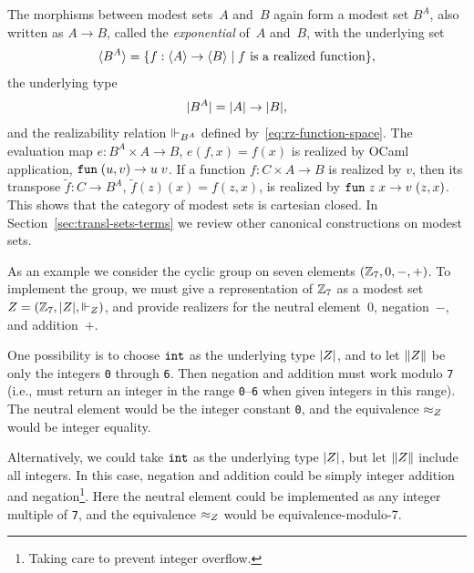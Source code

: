 The morphisms between modest sets~$A$ and~$B$ again form a modest set
$B^A$, also written as $A \to B$, called the \emph{exponential} of~$A$
and~$B$, with the underlying set
%
\begin{equation*}
  \langle B^A \rangle =
  \{f : \langle A \rangle \to \langle B \rangle \mid \text{$f$ is a realized function}\},
\end{equation*}
%
the underlying type
%
\begin{equation*}
  |B^A| = |A| \to |B|,
\end{equation*}
%
and the realizability relation $\Vdash_{B^A}$ defined
by~\eqref{eq:rz-function-space}. The evaluation map $e : B^A \times A
\to B$, $e(f,x) = f(x)$ is realized by OCaml application,
$\mathtt{fun}\;(u,v) \to u\;v$. If a function $f : C \times A \to B$ is realized
by $v$, then its transpose $\tilde{f} : C \to B^A$, $\tilde{f}(z)(x) =
f(z,x)$, is realized by $\mathtt{fun}\;z\;x \to v \; (z,x)$. This shows that the
category of modest sets is cartesian closed. In
Section~\ref{sec:transl-sets-terms} we review other canonical
constructions on modest sets.

\bigskip
\else %
\fi %


\iflong
As an example we consider the cyclic group on seven elements $(\mathbb{Z}_7,
0, {-}, {+})$. To implement the group, we must give a representation
of $\mathbb{Z}_7$ as a modest set~$Z = (\mathbb{Z}_7, |Z|, {\Vdash_Z})$, and
provide realizers for the neutral element~$0$, negation~$-$, and
addition~$+$. 

One possibility is to choose $\mathtt{int}$ as the underlying type $|Z|$,
and to let $\|Z\|$ be only the integers \texttt{0} through \texttt{6}.
Then negation and addition must work modulo \texttt{7} (i.e., must return an integer in the
range \texttt{0}--\texttt{6} when given integers in this range).
The neutral element would be the integer constant \texttt{0}, and the
equivalence $\approx_Z$ would be integer equality.

Alternatively, we could take $\mathtt{int}$ as the underlying type
$|Z|$, but let $\|Z\|$ include all integers. In this
case, negation and addition could be simply integer addition and
negation\footnote{Taking care to prevent integer
  overflow.}. Here the neutral element could be implemented as any
integer multiple of \texttt{7}, and the equivalence $\approx_Z$ would be
equivalence-modulo-7.

